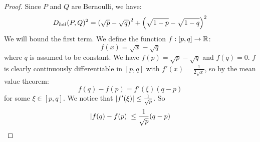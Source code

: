 \begin{proof}
Since $P$ and $Q$ are Bernoulli, we have:
$$
D_{hel}(P,Q)^2 = \left(\sqrt{p}- \sqrt{q}\right)^2 + \left(\sqrt{1-p}- \sqrt{1-q}\right)^2
$$
We will bound the first term. We define the function $f:[p,q]\to \mathbb{R}$:
$$
f(x) = \sqrt{x} - \sqrt{q}
$$
where $q$ is assumed to be constant. We have $f(p) = \sqrt{p} - \sqrt{q}$ and $ f(q) = 0$. $f$ is clearly continuously differentiable in $[p,q] $ with $f'(x) = \frac{1}{2\sqrt{x}}$,  
so by the mean value theorem:
$$
f(q)-f(p) = f'(\xi) (q-p)
$$
for some $\xi \in [p,q]$. We notice that $\left|f'(\xi)\right| \leq \frac{1}{\sqrt{p}}$. So
$$
\left|f(q)-f(p)\right| \leq  \frac{1}{\sqrt{p}}(q-p)
$$
\end{proof}
